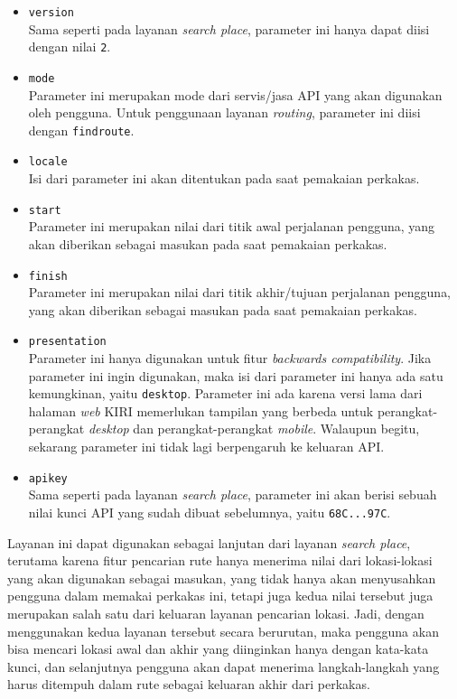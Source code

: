 \begin{itemize}
	\item \verb|version|\\
	Sama seperti pada layanan \textit{search place}, parameter ini hanya dapat diisi dengan nilai \verb|2|.
	\item \verb|mode|\\
	Parameter ini merupakan mode dari servis/jasa API yang akan digunakan oleh pengguna. Untuk penggunaan layanan \textit{routing}, parameter ini diisi dengan \verb|findroute|.
	\item \verb|locale|\\
	Isi dari parameter ini akan ditentukan pada saat pemakaian perkakas.
	\item \verb|start|\\
	Parameter ini merupakan nilai \latlon\xspace dari titik awal perjalanan pengguna, yang akan diberikan sebagai masukan pada saat pemakaian perkakas.
	\item \verb|finish|\\
	Parameter ini merupakan nilai \latlon\xspace dari titik akhir/tujuan perjalanan pengguna, yang akan diberikan sebagai masukan pada saat pemakaian perkakas.
	\item \verb|presentation|\\
	Parameter ini hanya digunakan untuk fitur \textit{backwards compatibility}. Jika parameter ini ingin digunakan, maka isi dari parameter ini hanya ada satu kemungkinan, yaitu \verb|desktop|. Parameter ini ada karena versi lama dari halaman \textit{web} KIRI memerlukan tampilan yang berbeda untuk perangkat-perangkat \textit{desktop} dan perangkat-perangkat \textit{mobile}. Walaupun begitu, sekarang parameter ini tidak lagi berpengaruh ke keluaran API.
	\item \verb|apikey|\\
	Sama seperti pada layanan \textit{search place}, parameter ini akan berisi sebuah nilai kunci API yang sudah dibuat sebelumnya, yaitu \verb|68C...97C|.
\end{itemize}
\vspace{\baselineskip}\noindent
Layanan ini dapat digunakan sebagai lanjutan dari layanan \textit{search place}, terutama karena fitur pencarian rute hanya menerima nilai \latlon\xspace dari lokasi-lokasi yang akan digunakan sebagai masukan, yang tidak hanya akan menyusahkan pengguna dalam memakai perkakas \cl\xspace ini, tetapi juga kedua nilai tersebut juga merupakan salah satu dari keluaran layanan pencarian lokasi. Jadi, dengan menggunakan kedua layanan tersebut secara berurutan, maka pengguna akan bisa mencari lokasi awal dan akhir yang diinginkan hanya dengan kata-kata kunci, dan selanjutnya pengguna akan dapat menerima langkah-langkah yang harus ditempuh dalam rute sebagai keluaran akhir dari perkakas.

